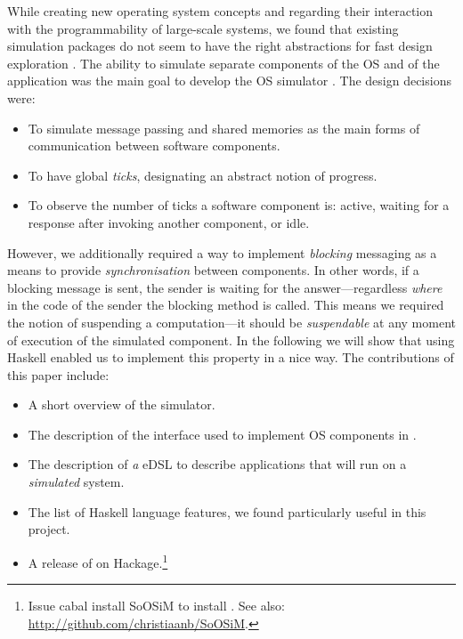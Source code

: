 While creating new operating system concepts and regarding their interaction with the programmability of large-scale systems, we found that existing simulation packages do not seem to have the right abstractions for fast design exploration \cite{cotson,omnet}.
The ability to simulate separate components of the OS and of the application was the main goal to develop the OS simulator \soosim \cite{Baaij:2012}.
The design decisions were:
\begin{itemize}
\item To simulate message passing and shared memories as the main forms of communication between software components.
\item To have global \emph{ticks}, designating an abstract notion of progress.
\item To observe the number of ticks a software component is: active, waiting for a response after invoking another component, or idle.
\end{itemize}
However, we additionally required a way to implement \emph{blocking} messaging as a means to provide \emph{synchronisation} between components.
In other words, if a blocking message is sent, the sender is waiting for the answer---regardless \emph{where} in the code of the sender the blocking  method is called.
This means we required the notion of suspending a computation---it should be \emph{suspendable} at any moment of execution of the simulated component.
In the following we will show that using Haskell\nolinebreak[3] \cite{haskell-report} enabled us to implement this property in a nice way.
The contributions of this paper include:
\begin{itemize}
\item A short overview of the \soosim simulator.
\item The description of the interface used to implement OS components in \soosim.
\item The description of \emph{a} eDSL to describe applications that will run on a \soosim \emph{simulated} system.
\item The list of Haskell language features, we found particularly useful in this project.
\item A release of \soosim on Hackage.\footnote{Issue \textsf{cabal install SoOSiM} to install \soosim. See also: \url{http://github.com/christiaanb/SoOSiM}.}
\end{itemize}
